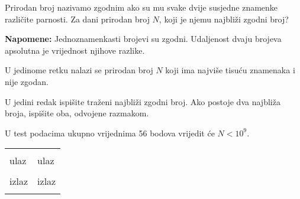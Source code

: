 \renewcommand{\taskname}{ZGODAN}
\renewcommand{\timelimit}{1 sekunda}
\renewcommand{\memorylimit}{32 MB}
\renewcommand{\score}{120 bodova}

Prirodan broj nazivamo zgodnim ako su mu svake dvije susjedne znamenke različite parnosti.
Za dani prirodan broj $N$, koji je njemu najbliži zgodni broj?

\textbf{Napomene:} Jednoznamenkasti brojevi su zgodni. Udaljenost dvaju brojeva apsolutna je vrijednost njihove razlike.

\strut


U jedinome retku nalazi se prirodan broj $N$ koji ima najviše tisuću znamenaka i nije zgodan.

\strut
{}

U jedini redak ispišite traženi najbliži zgodni broj. Ako postoje dva najbliža broja, ispišite oba, odvojene razmakom.

\strut
{}

U test podacima ukupno vrijednima 56 bodova vrijedit će $N < 10^9$.

\strut


\begin{center}
\fontfamily{\ttdefault}
\fontsize{10pt}{1em}
\selectfont
\begin{tabu}to 0.99\textwidth{|X[1]|X[1]|}
\hline
& \\ 
\rowfont{\fontsize{10pt}{1em}\bfseries}
ulaz & ulaz \\
 &
 \\
\rowfont{\fontsize{10pt}{1em}\bfseries}
izlaz & izlaz \\
 &
 \\
\hline
\end{tabu}
\end{center}

{
\fontsize{10pt}{1em}
\selectfont
}